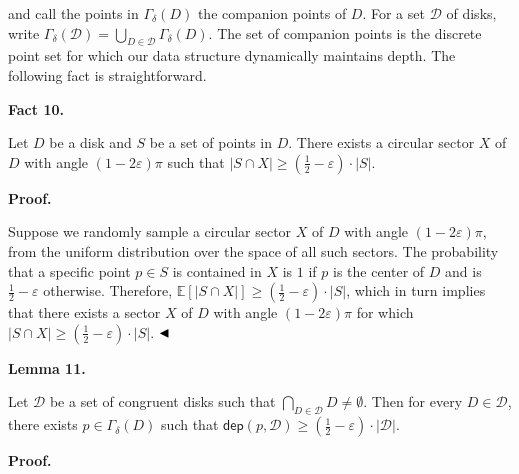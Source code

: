 \documentclass[10pt,a4paper]{article}
\begin{document}
and call the points in $\varGamma_{\delta}(D)$ the companion points of $D$. For a set $\mathcal{D}$ of disks, write $\varGamma_{\delta}(\mathcal{D})=\bigcup_{D\in\mathcal{D}}\varGamma_{\delta}(D)$. The set of companion points is the discrete point set for which our data structure dynamically maintains depth. The following fact is straightforward.
\par
\par
\par\medskip\noindent\textbf{Fact 10.}\par
Let $D$ be a disk and $S$ be a set of points in $D$. There exists a circular sector $X$ of $D$ with angle $(1-2\varepsilon)\pi$ such that $|S\cap X|\geq(\frac{1}{2}-\varepsilon)\cdot|S|$.
\par
\par
\par
\par\medskip\noindent\textbf{Proof.}\par
Suppose we randomly sample a circular sector $X$ of $D$ with angle $(1-2\varepsilon)\pi$, from the uniform distribution over the space of all such sectors. The probability that a specific point $p\in S$ is contained in $X$ is $1$ if $p$ is the center of $D$ and is $\frac{1}{2}-\varepsilon$ otherwise. Therefore, $\mathbb{E}[|S\cap X|]\geq(\frac{1}{2}-\varepsilon)\cdot|S|$, which in turn implies that there exists a sector $X$ of $D$ with angle $(1-2\varepsilon)\pi$ for which $|S\cap X|\geq(\frac{1}{2}-\varepsilon)\cdot|S|$. $\hfill\blacktriangleleft$
\par
\par
\par\medskip\noindent\textbf{Lemma 11.}\par
Let $\mathcal{D}$ be a set of congruent disks such that $\bigcap_{D\in\mathcal{D}}D\neq\emptyset$. Then for every $D\in\mathcal{D}$, there exists $p\in\varGamma_{\delta}(D)$ such that $\mathsf{dep}(p,\mathcal{D})\geq\left(\frac{1}{2}-\varepsilon\right)\cdot|%
\mathcal{D}|$.
\par
\par
\par
\par\medskip\noindent\textbf{Proof.}\par
\end{document}
